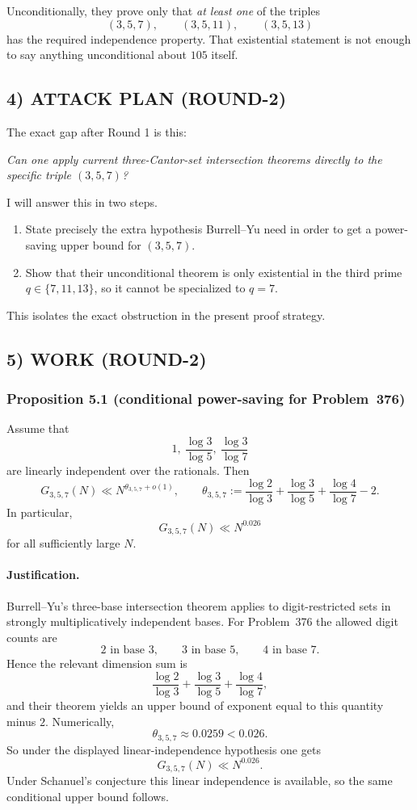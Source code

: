 Unconditionally, they prove only that \emph{at least one} of the triples
\[
(3,5,7),\qquad (3,5,11),\qquad (3,5,13)
\]
has the required independence property.
That existential statement is not enough to say anything unconditional about $105$ itself.

\subsection*{4) ATTACK PLAN (ROUND-2)}
The exact gap after Round 1 is this:

\medskip

\centerline{\emph{Can one apply current three-Cantor-set intersection theorems directly to the specific triple $(3,5,7)$?}}

\medskip

I will answer this in two steps.
\begin{enumerate}
\item State precisely the extra hypothesis Burrell--Yu need in order to get a power-saving upper bound for $(3,5,7)$.
\item Show that their unconditional theorem is only existential in the third prime $q\in\{7,11,13\}$, so it cannot be specialized to $q=7$.
\end{enumerate}
This isolates the exact obstruction in the present proof strategy.

\subsection*{5) WORK (ROUND-2)}

\subsubsection*{Proposition 5.1 (conditional power-saving for Problem~376)}
Assume that
\[
1,\ \frac{\log 3}{\log 5},\ \frac{\log 3}{\log 7}
\]
are linearly independent over the rationals.
Then
\[
G_{3,5,7}(N)\ll N^{\theta_{3,5,7}+o(1)},
\qquad
\theta_{3,5,7}:=\frac{\log 2}{\log 3}+\frac{\log 3}{\log 5}+\frac{\log 4}{\log 7}-2.
\]
In particular,
\[
G_{3,5,7}(N)\ll N^{0.026}
\]
for all sufficiently large $N$.

\paragraph{Justification.}
Burrell--Yu's three-base intersection theorem applies to digit-restricted sets in strongly multiplicatively independent bases.
For Problem~376 the allowed digit counts are
\[
2 \text{ in base }3,\qquad 3 \text{ in base }5,\qquad 4 \text{ in base }7.
\]
Hence the relevant dimension sum is
\[
\frac{\log 2}{\log 3}+\frac{\log 3}{\log 5}+\frac{\log 4}{\log 7},
\]
and their theorem yields an upper bound of exponent equal to this quantity minus $2$.
Numerically,
\[
\theta_{3,5,7}\approx 0.0259<0.026.
\]
So under the displayed linear-independence hypothesis one gets
\[
G_{3,5,7}(N)\ll N^{0.026}.
\]
Under Schanuel's conjecture this linear independence is available, so the same conditional upper bound follows.

